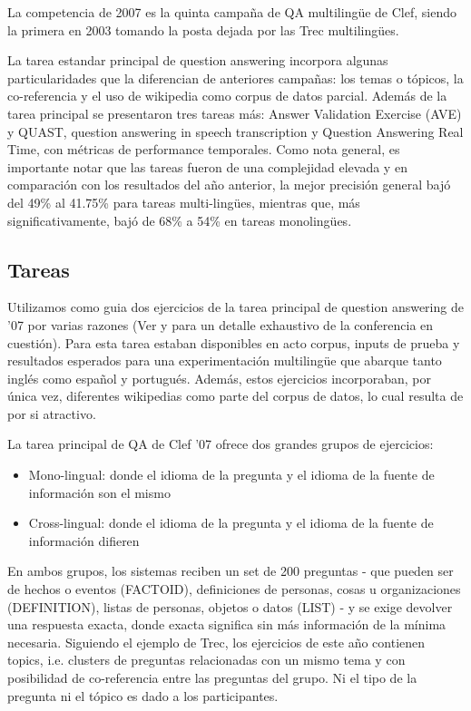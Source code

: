 La competencia de 2007 es la quinta campaña de QA multilingüe de Clef, siendo la primera en 2003 {\color{red} tomando la posta dejada por las Trec multilingües}. 

La tarea estandar principal de question answering incorpora algunas particularidades que la diferencian de anteriores campañas: los temas o tópicos, la co-referencia y el uso de wikipedia como corpus de datos parcial. Además de la tarea principal se presentaron tres tareas más: Answer Validation Exercise (AVE) y QUAST, question answering in speech transcription y Question Answering Real Time, con métricas de performance temporales. Como nota general, es importante notar que las tareas fueron de una complejidad elevada y en comparación con los resultados del año anterior, la mejor precisión general bajó del 49\% al 41.75\% para tareas multi-lingües, mientras que, más significativamente, bajó de 68\% a 54\% en tareas monolingües.


\subsection{Tareas}
\label{subsec:tareas}
Utilizamos como guia dos ejercicios de la tarea principal de question answering de '07  por varias razones (Ver \cite{GuidelineClef07} y \cite{OverviewClef07} para un detalle exhaustivo de la conferencia en cuestión). Para esta tarea estaban disponibles en acto corpus, inputs de prueba y resultados esperados para una experimentación multilingüe que abarque tanto inglés como español y portugués. Además, estos ejercicios incorporaban, por única vez, diferentes wikipedias como parte del corpus de datos, lo cual resulta de por si atractivo. 

La tarea principal de QA de Clef '07 ofrece dos grandes grupos de ejercicios:
\begin{itemize}
\item Mono-lingual: donde el idioma de la pregunta y el idioma de la fuente de información son el mismo
\item Cross-lingual: donde el idioma de la pregunta y el idioma de la fuente de información difieren
\end{itemize}

En ambos grupos, los sistemas reciben un set de 200 preguntas - que pueden ser de hechos o eventos (FACTOID), definiciones de personas, cosas u organizaciones (DEFINITION), listas de personas, objetos o datos (LIST) - y se exige devolver una respuesta exacta, donde exacta significa sin más información de la mínima necesaria. Siguiendo el ejemplo de Trec, los ejercicios de este año contienen topics, i.e. clusters de preguntas relacionadas con un mismo tema y con posibilidad de co-referencia entre las preguntas del grupo. Ni el tipo de la pregunta ni el tópico es dado a los participantes.

